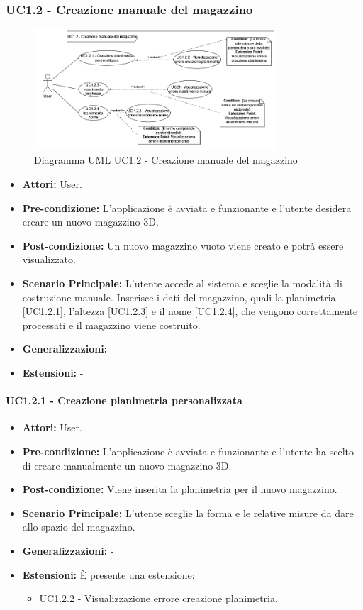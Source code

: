 \subsubsection{UC1.2 - Creazione manuale del magazzino}
\begin{figure}[H]
    \centering
    \includegraphics[width=0.8\textwidth]{UC_diagrams_1-10/UC1.2.drawio.png}
    \caption{Diagramma UML UC1.2 - Creazione manuale del magazzino}
\end{figure}
\begin{itemize}
    \item \textbf{Attori:} User.
    \item \textbf{Pre-condizione:} L'applicazione è avviata e funzionante e l'utente desidera creare un nuovo magazzino 3D.
    \item \textbf{Post-condizione:} Un nuovo magazzino vuoto viene creato e potrà essere visualizzato.
    \item \textbf{Scenario Principale:}  L’utente accede al sistema e sceglie la modalità di costruzione manuale. Inserisce i dati del magazzino, quali la planimetria [UC1.2.1], l'altezza [UC1.2.3] e il nome  [UC1.2.4], che vengono correttamente processati e il magazzino viene costruito.
    \item \textbf{Generalizzazioni:} -
    \item \textbf{Estensioni:} -
\end{itemize}


\paragraph{UC1.2.1 - Creazione planimetria personalizzata}
\begin{itemize}
    \item \textbf{Attori:} User.
    \item \textbf{Pre-condizione:}  L'applicazione è avviata e funzionante e l'utente ha scelto di creare manualmente un nuovo magazzino 3D.
    \item \textbf{Post-condizione:} Viene inserita la planimetria per il nuovo magazzino.
    \item \textbf{Scenario Principale:}  L’utente sceglie la forma e le relative misure da dare allo spazio del magazzino.
    \item \textbf{Generalizzazioni:} -
    \item \textbf{Estensioni:} È presente una estensione:
    \begin{itemize}
        \item UC1.2.2 - Visualizzazione errore creazione planimetria.
    \end{itemize}
\end{itemize}


